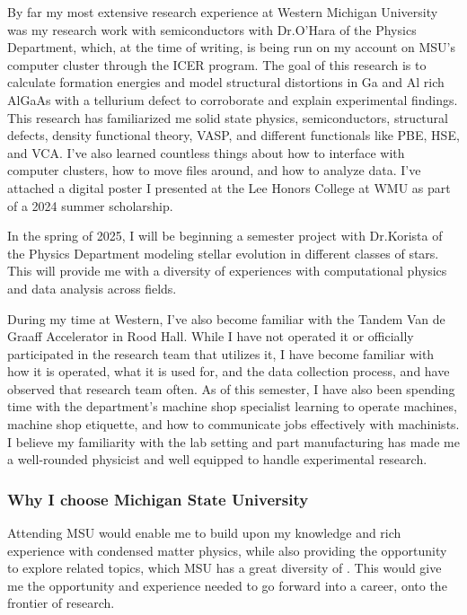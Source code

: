 \documentclass[11pt]{article}
\newcommand{\school}{Michigan State University}
\newcommand{\schoolabbr}{MSU}
\begin{document}
By far my most extensive research experience at Western Michigan University was my research work with semiconductors with Dr.\@ O'Hara of the Physics Department, which, at the time of writing, is being run on my account on MSU's computer cluster through the ICER program. The goal of this research is to calculate formation energies and model structural distortions in Ga and Al rich AlGaAs with a tellurium defect to corroborate and explain experimental findings. This research has familiarized me solid state physics, semiconductors, structural defects, density functional theory, VASP, and different functionals like PBE, HSE, and VCA. I've also learned countless things about how to interface with computer clusters, how to move files around, and how to analyze data. I've attached a digital poster I presented at the Lee Honors College at WMU as part of a 2024 summer scholarship.

In the spring of 2025, I will be beginning a semester project with Dr.\@ Korista of the Physics Department modeling stellar evolution in different classes of stars. This will provide me with a diversity of experiences with computational physics and data analysis across fields.

During my time at Western, I've also become familiar with the Tandem Van de Graaff Accelerator in Rood Hall. While I have not operated it or officially participated in the research team that utilizes it, I have become familiar with how it is operated, what it is used for, and the data collection process, and have observed that research team often. As of this semester, I have also been spending time with the department's machine shop specialist learning to operate machines, machine shop etiquette, and how to communicate jobs effectively with machinists. I believe my familiarity with the lab setting and part manufacturing has made me a well-rounded physicist and well equipped to handle experimental research.

\subsubsection*{Why I choose \school{}}
Attending \schoolabbr{} would enable me to build upon my knowledge and rich experience with condensed matter physics, while also providing the opportunity to explore related topics, which \schoolabbr{} has a great diversity of . This would give me the opportunity and experience needed to go forward into a career, onto the frontier of research.
\end{document}

